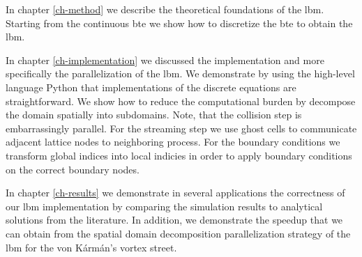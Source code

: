 \documentclass[a4paper,11pt, footsepline]{book}
\begin{document}
In chapter \ref{ch-method} we describe the theoretical foundations of the \ac{lbm}. Starting from the continuous \ac{bte} we show how to discretize the \ac{bte} to obtain the \ac{lbm}.

In chapter \ref{ch-implementation} we discussed the implementation and more specifically the parallelization of the \ac{lbm}. We demonstrate by using the high-level language Python that implementations of the discrete equations are straightforward. We show how to reduce the computational burden by decompose the domain spatially into subdomains. Note, that the collision step is embarrassingly parallel. For the streaming step we use ghost cells to communicate adjacent lattice nodes to neighboring process. For the boundary conditions we transform global indices into local indicies in order to apply boundary conditions on the correct boundary nodes.

In chapter \ref{ch-results} we demonstrate in several applications the correctness of our \ac{lbm} implementation by comparing the simulation results to analytical solutions from the literature. In addition, we demonstrate the speedup that we can obtain from the spatial domain decomposition parallelization strategy of the \ac{lbm} for the von K\'{a}rm\'{a}n's vortex street.

\newpage



\end{document}
